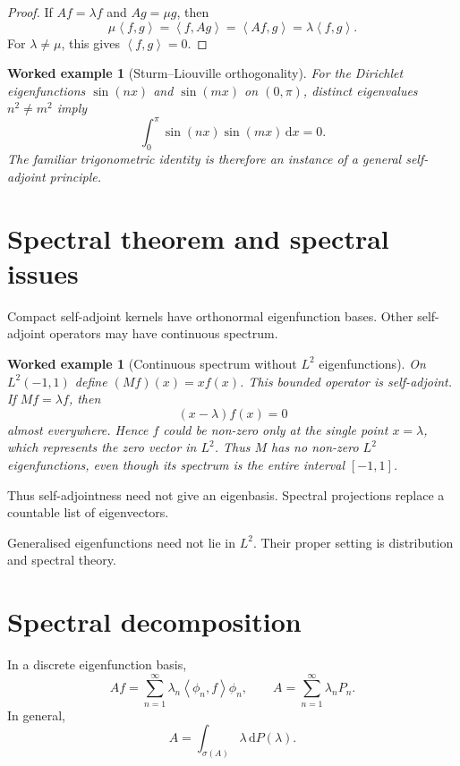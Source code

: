 \documentclass[11pt,a5paper,oneside,openany]{scrreprt}
\theoremstyle{notes}
\theoremstyle{definitions}
\newtheorem{example}[theorem]{Worked example}
\newcommand{\ip}[2]{\left\langle #1,#2\right\rangle}
\newcommand{\dd}{\,\mathrm{d}}
\begin{document}
\begin{proof}
If $Af=\lambda f$ and $Ag=\mu g$, then
\[
 \mu\ip{f}{g}=\ip{f}{Ag}=\ip{Af}{g}=\lambda\ip{f}{g}.
\]
For $\lambda\ne\mu$, this gives $\ip{f}{g}=0$.
\end{proof}

\begin{example}[Sturm--Liouville orthogonality]
For the Dirichlet eigenfunctions $\sin(nx)$ and $\sin(mx)$ on $(0,\pi)$,
distinct eigenvalues $n^2\ne m^2$ imply
\[
 \int_0^\pi\sin(nx)\sin(mx)\dd x=0.
\]
The familiar trigonometric identity is therefore an instance of a general
self-adjoint principle.
\end{example}

\section{Spectral theorem and spectral issues}

Compact self-adjoint kernels have orthonormal eigenfunction bases.
Other self-adjoint operators may have continuous spectrum.

\begin{example}[Continuous spectrum without $L^2$ eigenfunctions]
On $L^2(-1,1)$ define $(Mf)(x)=xf(x)$.  This bounded operator is
self-adjoint.  If $Mf=\lambda f$, then
\[
 (x-\lambda)f(x)=0
\]
almost everywhere.  Hence $f$ could be non-zero only at the single point
$x=\lambda$, which represents the zero vector in $L^2$.  Thus $M$ has no
non-zero $L^2$ eigenfunctions, even though its spectrum is the entire interval
$[-1,1]$.
\end{example}

Thus self-adjointness need not give an eigenbasis.  Spectral projections replace
a countable list of eigenvectors.

\begin{caution}
Generalised eigenfunctions need not lie in $L^2$.  Their proper setting is
distribution and spectral theory.
\end{caution}

\section{Spectral decomposition}

In a discrete eigenfunction basis,
\[
  \boxed{Af=\sum_{n=1}^{\infty}\lambda_n
  \ip{\phi_n}{f}\phi_n},
  \qquad
  A=\sum_{n=1}^{\infty}\lambda_nP_n.
\]
In general,
\[
  \boxed{A=\int_{\sigma(A)}\lambda\dd P(\lambda)}.
\]
\end{document}
